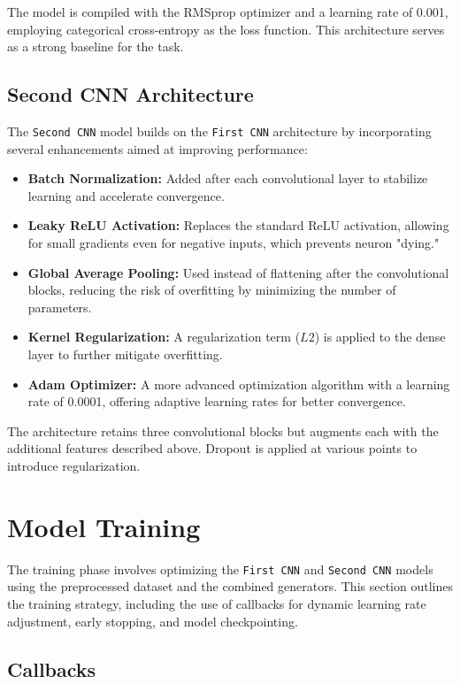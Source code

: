\documentclass{article}
\begin{document}
The model is compiled with the RMSprop optimizer and a learning rate of 0.001, employing categorical cross-entropy as the loss function. This architecture serves as a strong baseline for the task.

\subsection{Second CNN Architecture}

The \texttt{Second CNN} model builds on the \texttt{First CNN} architecture by incorporating several enhancements aimed at improving performance:
\begin{itemize}
    \item \textbf{Batch Normalization:} Added after each convolutional layer to stabilize learning and accelerate convergence.
    \item \textbf{Leaky ReLU Activation:} Replaces the standard ReLU activation, allowing for small gradients even for negative inputs, which prevents neuron "dying."
    \item \textbf{Global Average Pooling:} Used instead of flattening after the convolutional blocks, reducing the risk of overfitting by minimizing the number of parameters.
    \item \textbf{Kernel Regularization:} A regularization term (\(L2\)) is applied to the dense layer to further mitigate overfitting.
    \item \textbf{Adam Optimizer:} A more advanced optimization algorithm with a learning rate of 0.0001, offering adaptive learning rates for better convergence.
\end{itemize}

The architecture retains three convolutional blocks but augments each with the additional features described above. Dropout is applied at various points to introduce regularization.

\section{Model Training}

The training phase involves optimizing the \texttt{First CNN} and \texttt{Second CNN} models using the preprocessed dataset and the combined generators. This section outlines the training strategy, including the use of callbacks for dynamic learning rate adjustment, early stopping, and model checkpointing.

\subsection{Callbacks}
\end{document}
